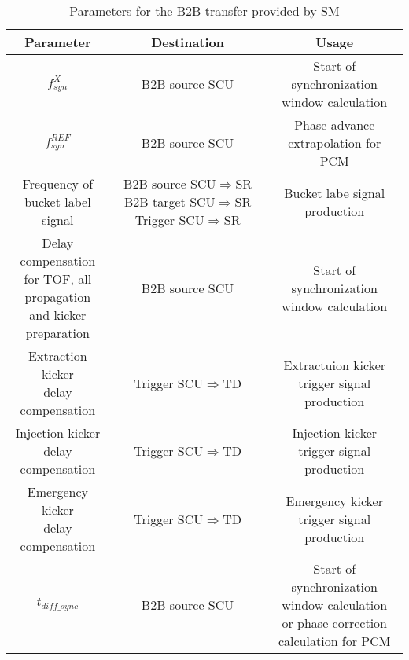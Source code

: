 \label{parameter_SM}
\begin{landscape} 
\begin{table}[!htb]

\caption{Parameters for the B2B transfer provided by SM}
\label{requirement}
\begin{center}
    \begin{tabular}{ | c | c | c |}
    \hline
\rowcolor[gray]{0.5}
     	Parameter &Destination & Usage  \\ \hline
$f_{\mathit{syn}}^X $							&	B2B source SCU	&	Start of synchronization window calculation\\ \hline
$f_{\mathit{syn}}^\mathit{REF} 	$			&	B2B source SCU	&	Phase advance extrapolation for PCM	\\ \hline
\tabincell{c}{Frequency of\\ bucket label signal} 			&	\tabincell{c}{B2B source SCU$\Rightarrow$SR\\B2B target SCU$\Rightarrow$SR\\Trigger SCU$\Rightarrow$SR}& Bucket labe signal production\\ \hline
\tabincell{c}{Delay compensation\\ for TOF, all propagation\\ and kicker preparation}	&	B2B source SCU	& Start of synchronization window calculation\\ \hline
\tabincell{c}{Extraction kicker \\delay compensation}&		Trigger SCU$\Rightarrow$TD			&Extractuion kicker trigger signal production	\\ \hline
\tabincell{c}{Injection kicker \\delay compensation} &		Trigger SCU$\Rightarrow$TD			&Injection kicker trigger signal production\\ \hline
\tabincell{c}{Emergency kicker \\delay compensation} &		Trigger SCU$\Rightarrow$TD			&Emergency kicker trigger signal production\\ \hline
$t_{\mathit{diff\_sync}}$ 							&		B2B source SCU	&\tabincell{c}{Start of synchronization window calculation \\ or phase correction calculation for PCM} \\ \hline

\end{tabular}
\end{center}
\end{table}
\end{landscape}
